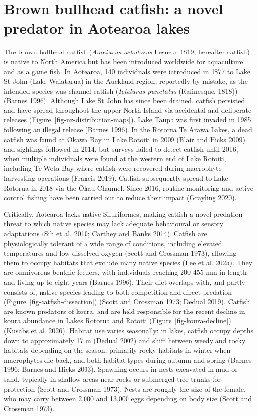 \documentclass[
  12pt,
  a4paper,
  oneside]{scrbook}
\begin{document}
\section{Brown bullhead catfish: a novel predator in Aotearoa
lakes}\label{brown-bullhead-catfish-a-novel-predator-in-aotearoa-lakes}

The brown bullhead catfish (\emph{Ameiurus nebulosus} Lesueur 1819,
hereafter catfish) is native to North America but has been introduced
worldwide for aquaculture and as a game fish. In Aotearoa, 140
individuals were introduced in 1877 to Lake St John (Lake Waiatarua) in
the Auckland region, reportedly by mistake, as the intended species was
channel catfish (\emph{Ictalurus punctatus} (Rafinesque, 1818)) (Barnes
1996). Although Lake St John has since been drained, catfish persisted
and have spread throughout the upper North Island via accidental and
deliberate releases (Figure~\ref{fig-nz-distribution-maps}). Lake Taupō
was first invaded in 1985 following an illegal release (Barnes 1996). In
the Rotorua Te Arawa Lakes, a dead catfish was found at Okawa Bay in
Lake Rotoiti in 2009 (Blair and Hicks 2009) and sightings followed in
2014, but surveys failed to detect catfish until 2016, when multiple
individuals were found at the western end of Lake Rotoiti, including Te
Weta Bay where catfish were recovered during macrophyte harvesting
operations (Francis 2019). Catfish subsequently spread to Lake Rotorua
in 2018 via the Ōhau Channel. Since 2016, routine monitoring and active
control fishing have been carried out to reduce their impact (Grayling
2020).

Critically, Aotearoa lacks native Siluriformes, making catfish a novel
predation threat to which native species may lack adequate behavioural
or sensory adaptations (Sih et al. 2010; Carthey and Banks 2014).
Catfish are physiologically tolerant of a wide range of conditions,
including elevated temperatures and low dissolved oxygen (Scott and
Crossman 1973), allowing them to occupy habitats that exclude many
native species (Lee et al. 2025). They are omnivorous benthic feeders,
with individuals reaching 200-455 mm in length and living up to eight
years (Barnes 1996). Their diet overlaps with, and partly consists of,
native species leading to both competition and direct predation
(Figure~\ref{fig-catfish-dissection}) (Scott and Crossman 1973; Dedual
2019). Catfish are known predators of kōura, and are held responsible
for the recent decline in kōura abundance in Lakes Rotorua and Rotoiti
(Figure~\ref{fig-koura-decline}) (Kusabs et al. 2026). Habitat use
varies seasonally: in lakes, catfish occupy depths down to approximately
17 m (Dedual 2002) and shift between weedy and rocky habitats depending
on the season, primarily rocky habitats in winter when macrophytes die
back, and both habitat types during autumn and spring (Barnes 1996;
Barnes and Hicks 2003). Spawning occurs in nests excavated in mud or
sand, typically in shallow areas near rocks or submerged tree trunks for
protection (Scott and Crossman 1973). Nests are roughly the size of the
female, who may carry between 2,000 and 13,000 eggs depending on body
size (Scott and Crossman 1973).
\end{document}
